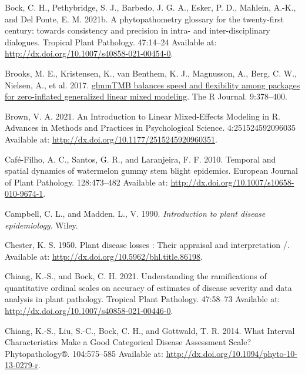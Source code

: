 \documentclass[
  letterpaper,
]{book}
\newlength{\cslhangindent}
\newlength{\cslentryspacingunit} %
\newenvironment{CSLReferences}[2] %
 {%
  \setlength{\parindent}{0pt}
  \ifodd #1
  \let\oldpar\par
  \def\par{\hangindent=\cslhangindent\oldpar}
  \fi
  \setlength{\parskip}{#2\cslentryspacingunit}
 }%
 {}
\begin{document}
\begin{CSLReferences}{0}{0}
\leavevmode{}%
Bock, C. H., Pethybridge, S. J., Barbedo, J. G. A., Esker, P. D.,
Mahlein, A.-K., and Del Ponte, E. M. 2021b. A phytopathometry glossary
for the twenty-first century: towards consistency and precision in
intra- and inter-disciplinary dialogues. Tropical Plant Pathology.
47:14--24 Available at:
\url{http://dx.doi.org/10.1007/s40858-021-00454-0}.

\leavevmode{}%
Brooks, M. E., Kristensen, K., van Benthem, K. J., Magnusson, A., Berg,
C. W., Nielsen, A., et al. 2017.
\href{https://doi.org/10.32614/RJ-2017-066}{{glmmTMB} balances speed and
flexibility among packages for zero-inflated generalized linear mixed
modeling}. The R Journal. 9:378--400.

\leavevmode{}%
Brown, V. A. 2021. An Introduction to Linear Mixed-Effects Modeling in
R. Advances in Methods and Practices in Psychological Science.
4:251524592096035 Available at:
\url{http://dx.doi.org/10.1177/2515245920960351}.

\leavevmode{}%
Café-Filho, A. C., Santos, G. R., and Laranjeira, F. F. 2010. Temporal
and spatial dynamics of watermelon gummy stem blight epidemics. European
Journal of Plant Pathology. 128:473--482 Available at:
\url{http://dx.doi.org/10.1007/s10658-010-9674-1}.

\leavevmode{}%
Campbell, C. L., and Madden. L., V. 1990. \emph{Introduction to plant
disease epidemiology}. Wiley.

\leavevmode{}%
Chester, K. S. 1950. Plant disease losses : Their appraisal and
interpretation /. Available at:
\url{http://dx.doi.org/10.5962/bhl.title.86198}.

\leavevmode{}%
Chiang, K.-S., and Bock, C. H. 2021. Understanding the ramifications of
quantitative ordinal scales on accuracy of estimates of disease severity
and data analysis in plant pathology. Tropical Plant Pathology.
47:58--73 Available at:
\url{http://dx.doi.org/10.1007/s40858-021-00446-0}.

\leavevmode{}%
Chiang, K.-S., Liu, S.-C., Bock, C. H., and Gottwald, T. R. 2014. What
Interval Characteristics Make a Good Categorical Disease Assessment
Scale? Phytopathology®. 104:575--585 Available at:
\url{http://dx.doi.org/10.1094/phyto-10-13-0279-r}.


\end{CSLReferences}
\end{document}

